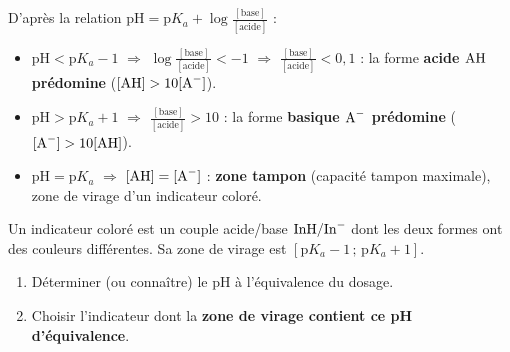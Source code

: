 \documentclass[11pt]{article}
\begin{document}
\begin{propriete}
D'après la relation $\mathrm{pH} = \mathrm{p}K_a + \log\frac{[\text{base}]}{[\text{acide}]}$ :
\begin{itemize}
\item $\mathrm{pH} < \mathrm{p}K_a - 1$ $\Rightarrow$ $\log\frac{[\text{base}]}{[\text{acide}]} < -1$ $\Rightarrow$ $\frac{[\text{base}]}{[\text{acide}]} < 0,1$ : la forme \textbf{acide $\ce{AH}$ prédomine} ($[\ce{AH}] > 10[\ce{A-}]$).
\item $\mathrm{pH} > \mathrm{p}K_a + 1$ $\Rightarrow$ $\frac{[\text{base}]}{[\text{acide}]} > 10$ : la forme \textbf{basique $\ce{A-}$ prédomine} ($[\ce{A-}] > 10[\ce{AH}]$).
\item $\mathrm{pH} = \mathrm{p}K_a$ $\Rightarrow$ $[\ce{AH}] = [\ce{A-}]$ : \textbf{zone tampon} (capacité tampon maximale), zone de virage d'un indicateur coloré.
\end{itemize}
\end{propriete}

\begin{methode}
Un indicateur coloré est un couple acide/base $\ce{InH}/\ce{In-}$ dont les deux formes ont des couleurs différentes. Sa zone de virage est $[\mathrm{p}K_a - 1\,;\, \mathrm{p}K_a + 1]$.
\begin{enumerate}
\item Déterminer (ou connaître) le pH à l'équivalence du dosage.
\item Choisir l'indicateur dont la \textbf{zone de virage contient ce pH d'équivalence}.
\end{enumerate}
\end{methode}
\end{document}
